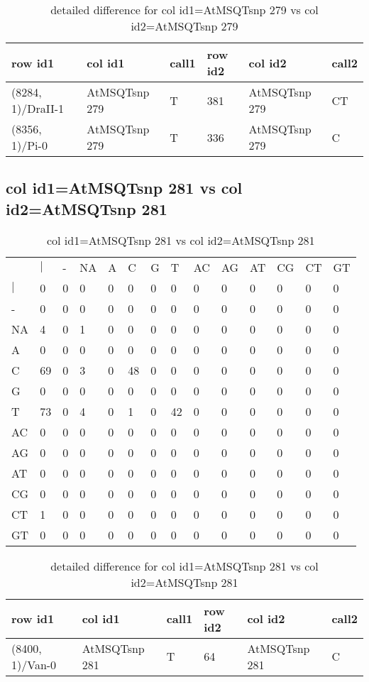 \begin{center}
\begin{longtable}{|l|l|l|l|l|l|}
\caption{detailed difference for col id1=AtMSQTsnp 279 vs col id2=AtMSQTsnp 279} \label{table_dm627}\\
\hline
row id1&col id1&call1&row id2&col id2&call2\\
\hline
(8284, 1)/DraII-1&AtMSQTsnp 279&T&381&AtMSQTsnp 279&CT\\
(8356, 1)/Pi-0&AtMSQTsnp 279&T&336&AtMSQTsnp 279&C\\
\hline
\end{longtable}
\end{center}

\subsection{col id1=AtMSQTsnp 281 vs col id2=AtMSQTsnp 281}
\begin{center}
\begin{longtable}{|l|l|l|l|l|l|l|l|l|l|l|l|l|l|}
\caption{col id1=AtMSQTsnp 281 vs col id2=AtMSQTsnp 281} \label{table_dm628}\\
\hline
\\
\hline
&$|$&-&NA&A&C&G&T&AC&AG&AT&CG&CT&GT\\
$|$&0&0&0&0&0&0&0&0&0&0&0&0&0\\
-&0&0&0&0&0&0&0&0&0&0&0&0&0\\
NA&4&0&1&0&0&0&0&0&0&0&0&0&0\\
A&0&0&0&0&0&0&0&0&0&0&0&0&0\\
C&69&0&3&0&48&0&0&0&0&0&0&0&0\\
G&0&0&0&0&0&0&0&0&0&0&0&0&0\\
T&73&0&4&0&1&0&42&0&0&0&0&0&0\\
AC&0&0&0&0&0&0&0&0&0&0&0&0&0\\
AG&0&0&0&0&0&0&0&0&0&0&0&0&0\\
AT&0&0&0&0&0&0&0&0&0&0&0&0&0\\
CG&0&0&0&0&0&0&0&0&0&0&0&0&0\\
CT&1&0&0&0&0&0&0&0&0&0&0&0&0\\
GT&0&0&0&0&0&0&0&0&0&0&0&0&0\\
\hline
\end{longtable}
\end{center}

\begin{center}
\begin{longtable}{|l|l|l|l|l|l|}
\caption{detailed difference for col id1=AtMSQTsnp 281 vs col id2=AtMSQTsnp 281} \label{table_dm629}\\
\hline
row id1&col id1&call1&row id2&col id2&call2\\
\hline
(8400, 1)/Van-0&AtMSQTsnp 281&T&64&AtMSQTsnp 281&C\\
\hline
\end{longtable}
\end{center}

